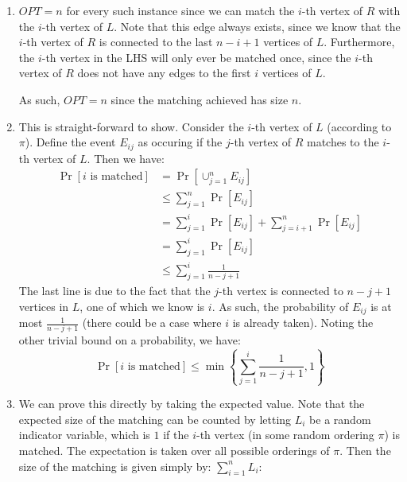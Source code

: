 \documentclass[12pt]{exam}
\newcommand{\Q}[1]{\question{\large{\textbf{#1}}}}
\begin{document}
\begin{questions}
\newpage
\Q{Problem 16}
\begin{solution}
  \begin{enumerate}[label=(\alph*)]
    \item $OPT = n$ for every such instance since we can match the $i$-th vertex of $R$ with the $i$-th vertex of $L$. Note that this edge always exists, since we know that the $i$-th vertex of $R$ is connected to the last $n - i + 1$ vertices of $L$. Furthermore, the $i$-th vertex in the LHS will only ever be matched once, since the $i$-th vertex of $R$ does not have any edges to the first $i$ vertices of $L$.

    As such, $OPT = n$ since the matching achieved has size $n$.

    \item
      This is straight-forward to show. Consider the $i$-th vertex of $L$ (according to $\pi$). Define the event $E_{ij}$ as occuring if the $j$-th vertex of $R$ matches to the $i$-th vertex of $L$. Then we have:
      \begin{align*}
        \Pr[i \text{ is matched}] &= \Pr[\cup_{j=1}^n E_{ij}] \tag{Any one matching means the vertex matched} \\
        &\leq \sum_{j=1}^n \Pr[E_{ij}] \tag{Union bound} \\ 
        &= \sum_{j=1}^i \Pr[E_{ij}] + \sum_{j=i+1}^n \Pr[E_{ij}] \tag{Splitting into vertices before $i$ and after $i$} \\
        &= \sum_{j=1}^i \Pr[E_{ij}] \tag{All vertices after the $j = i$-th only have vertices to nodes in $L$ that are not $i$} \\
        &\leq \sum_{j=1}^i \frac{1}{n -j + 1}
      \end{align*}
      The last line is due to the fact that the $j$-th vertex is connected to $n-j + 1$ vertices in $L$, one of which we know is $i$. As such, the probability of $E_{ij}$ is at most $\frac{1}{n - j + 1}$ (there could be a case where $i$ is already taken). Noting the other trivial bound on a probability, we have:
      \[
        \Pr[i \text{ is matched}] \leq \min \left\{ \sum_{j=1}^i \frac{1}{n-j+1}, 1 \right\}
      \]
    \item
      We can prove this directly by taking the expected value. Note that the expected size of the matching can be counted by letting $L_i$ be a random indicator variable, which is $1$ if the $i$-th vertex (in some random ordering $\pi$) is matched. The expectation is taken over all possible orderings of $\pi$. Then the size of the matching is given simply by: $\sum_{i=1}^n L_i$:

\end{enumerate}
\end{solution}
\end{questions}
\end{document}
